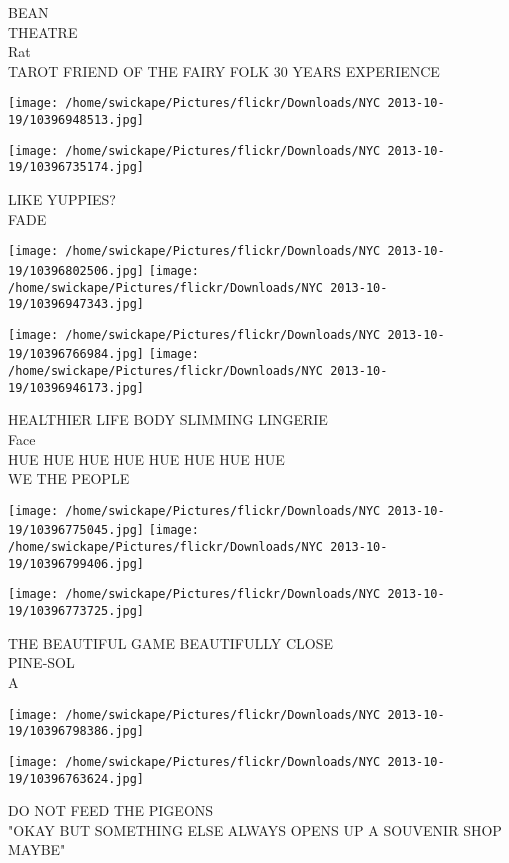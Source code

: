 \documentclass[10pt,letterpaper]{article}
\begin{document}
BEAN\\
THEATRE\\
Rat\\
TAROT FRIEND OF THE FAIRY FOLK 30 YEARS EXPERIENCE\\
\pagebreak

\texttt{[image: /home/swickape/Pictures/flickr/Downloads/NYC 2013-10-19/10396948513.jpg]}

\vspace{0.25in}
\texttt{[image: /home/swickape/Pictures/flickr/Downloads/NYC 2013-10-19/10396735174.jpg]}

LIKE YUPPIES?\\
FADE\\
\pagebreak

\texttt{[image: /home/swickape/Pictures/flickr/Downloads/NYC 2013-10-19/10396802506.jpg]}
\texttt{[image: /home/swickape/Pictures/flickr/Downloads/NYC 2013-10-19/10396947343.jpg]}

\texttt{[image: /home/swickape/Pictures/flickr/Downloads/NYC 2013-10-19/10396766984.jpg]}
\texttt{[image: /home/swickape/Pictures/flickr/Downloads/NYC 2013-10-19/10396946173.jpg]}

HEALTHIER LIFE BODY SLIMMING LINGERIE\\
Face\\
HUE HUE HUE HUE HUE HUE HUE HUE\\
WE THE PEOPLE\\
\pagebreak

\texttt{[image: /home/swickape/Pictures/flickr/Downloads/NYC 2013-10-19/10396775045.jpg]}
\texttt{[image: /home/swickape/Pictures/flickr/Downloads/NYC 2013-10-19/10396799406.jpg]}

\texttt{[image: /home/swickape/Pictures/flickr/Downloads/NYC 2013-10-19/10396773725.jpg]}

THE BEAUTIFUL GAME BEAUTIFULLY CLOSE\\
PINE{-}SOL\\
A\\
\pagebreak

\texttt{[image: /home/swickape/Pictures/flickr/Downloads/NYC 2013-10-19/10396798386.jpg]}

\vspace{0.25in}
\texttt{[image: /home/swickape/Pictures/flickr/Downloads/NYC 2013-10-19/10396763624.jpg]}

DO NOT FEED THE PIGEONS\\
"OKAY BUT SOMETHING ELSE ALWAYS OPENS UP A SOUVENIR SHOP MAYBE"\\
\pagebreak
\end{document}
